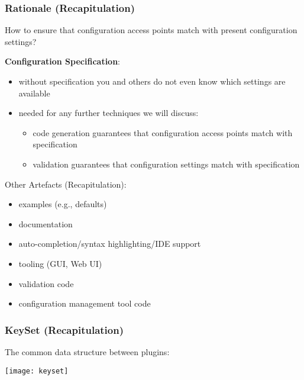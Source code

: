 \begin{frame}
	\frametitle{Rationale (Recapitulation)}
	\begin{task}
	How to ensure that configuration access points match with present configuration settings?
	\end{task}

	\pause
	\vspace{1em}

	\textbf{Configuration Specification}:
	\begin{itemize}
	\item without specification you and others do not even know which settings are available
	\item needed for any further techniques we will discuss:
		\begin{itemize}
		\item code generation guarantees that configuration access points match with specification
		\item validation guarantees that configuration settings match with specification
		\end{itemize}
	\end{itemize}
\end{frame}

\begin{frame}
	Other Artefacts (Recapitulation):

	\pause

	\begin{itemize}
	\item examples (e.g., defaults)
	\item documentation
	\item auto-completion/syntax highlighting/IDE support
	\item tooling (GUI, Web UI)
	\item validation code
	\item configuration management tool code
	\end{itemize}
\end{frame}

\begin{frame}
	\frametitle{KeySet (Recapitulation)}

	The common data structure between plugins:
	\vspace{1cm}

	\texttt{[image: keyset]}
\end{frame}

